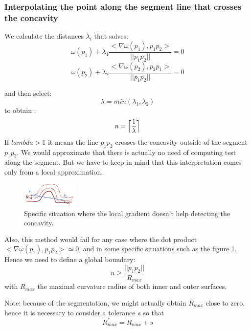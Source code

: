 \documentclass[11pt,a4paper]{article}
\begin{document}
\subsubsection{Interpolating the point along the segment line that crosses the concavity} \label{subsec}
We calculate the distances $\lambda_i$ that solves:
\begin{equation}
\omega (p_1) + \lambda_1 \frac{<\nabla \omega(p_1), p_1p_2>}{||p_1p_2||} = 0 
\end{equation}
\begin{equation}
\omega (p_2) + \lambda_2\frac{<\nabla \omega(p_2), p_2p_1>}{||p_1p_2||} = 0
\end{equation}

and then select:
\begin{equation}
\lambda = min(\lambda_1, \lambda_2)
\end{equation}
to obtain :
\begin{equation}
n = \Bigl\lceil \frac{1}{\lambda} \Bigr\rceil
\end{equation}
If $lambda > 1$ it means the line $p_1p_2$ crosses the concavity outside of the segment $p_1p_2$. We would approximate that there is actually no need of computing test along the segment. But we have to keep in mind that this interpretation comes only from a local approximation.

\begin{figure}[h!]
			\label{spe issue}
			\centering
			\includegraphics[width=0.25\textwidth]{Drawings/CurvatureTestExample1.png}
			\caption{Specific situation where the local gradient doesn't help detecting the concavity.}
\end{figure}
Also, this method would fail for any case where the dot product $<\nabla \omega(p_1), p_1p_2> \simeq 0$, and in some specific situations such as the figure \ref{spe issue}. Hence we need to define a global boundary:
\begin{equation}
n \geq \frac{||p_1p_2||}{R_{max}} 
\end{equation}
with $R_{max}$ the maximal curvature radius of both inner and outer surfaces.

Note: because of the segmentation, we might actually obtain $R_{max}$ close to zero, hence it is necessary to consider a tolerance $s$ so that 
\begin{equation}
R_{max}^* = R_{max} + s
\end{equation}
\end{document}
